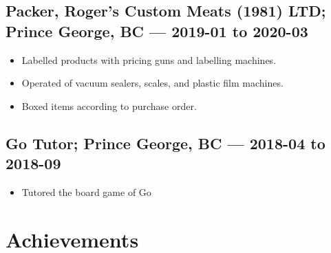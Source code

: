 \documentclass{article}
\begin{document}


\subsection*{Packer, Roger's Custom Meats (1981) LTD; Prince George, BC — 2019-01 to 2020-03}

\begin{itemize}
	\item Labelled products with pricing guns and labelling machines.
	\item Operated of vacuum sealers, scales, and plastic film machines.
	\item Boxed items according to purchase order.
\end{itemize}

\subsection*{Go Tutor; Prince George, BC — 2018-04 to 2018-09}

\begin{itemize}
	\item Tutored the board game of Go
\end{itemize}

\section*{Achievements}
\end{document}
